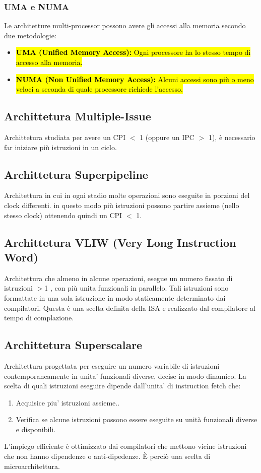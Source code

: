 \documentclass{article}
\begin{document}
\subsubsection{UMA e NUMA}
Le architetture multi-processor possono avere gli accessi alla memoria secondo due metodologie:
\begin{itemize}
    \item \hl{\textbf{UMA (Unified Memory Access):} Ogni processore ha lo stesso tempo di accesso alla memoria.}
    \item \hl{\textbf{NUMA (Non Unified Memory Access):} Alcuni accessi sono più o meno veloci a seconda di quale processore richiede l’accesso.}
\end{itemize}


\subsection{Archittetura Multiple-Issue}
Archittetura studiata per avere un CPI $<$ 1 (oppure un IPC $>$ 1), è necessario far iniziare più istruzioni in un ciclo. 

\subsection{Archittetura Superpipeline}
Architettura in cui in ogni stadio molte operazioni sono eseguite in porzioni del clock
differenti. in questo modo  più istruzioni possono partire assieme (nello stesso clock) ottenendo quindi un CPI $<$ 1.

\subsection{Archittetura VLIW (Very Long Instruction Word)}
Architettura che almeno in alcune operazioni, esegue un numero fissato di istruzioni $>$1 , con più unita funzionali in parallelo. Tali istruzioni sono formattate in una sola istruzione in modo staticamente determinato dai compilatori. Questa è una scelta definita della ISA e realizzato dal compilatore al tempo di complazione.

\subsection{Archittetura Superscalare}
Architettura progettata per eseguire un numero variabile di istruzioni contemporaneamente in unita’ funzionali diverse, decise in modo dinamico. La scelta di quali istruzioni eseguire dipende dall’unita’ di instruction fetch che:
\begin{enumerate}
    \item Acquisice piu’ istruzioni assieme..
    \item Verifica se alcune istruzioni possono essere eseguite su unità funzionali diverse e disponibili.
\end{enumerate}
L’impiego efficiente è ottimizzato dai compilatori che mettono vicine istruzioni che non hanno dipendenze o anti-dipedenze. È perciò una scelta di microarchitettura.
\end{document}
